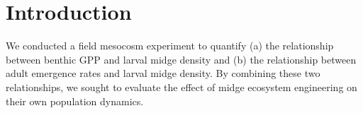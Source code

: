 \section*{Introduction}

We conducted a field mesocosm experiment to quantify 
(a) the relationship between benthic GPP and larval midge density and
(b) the relationship between adult emergence rates and larval midge density.
By combining these two relationships, we sought to evaluate the effect 
of midge ecosystem engineering on their own population dynamics.
